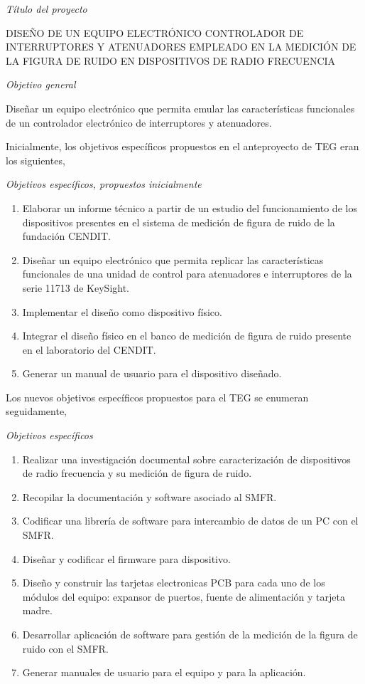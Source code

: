 \documentclass[paper=letter,oneside,fontsize=12pt, parskip=full]{article}
\begin{document}
	\emph{Título del proyecto}

	\begin{center}
		DISEÑO DE UN EQUIPO ELECTRÓNICO CONTROLADOR DE
		INTERRUPTORES Y ATENUADORES EMPLEADO EN LA
		MEDICIÓN DE LA FIGURA DE RUIDO EN DISPOSITIVOS DE
		RADIO FRECUENCIA
	\end{center}		

	\emph{Objetivo general}
	
	Diseñar un equipo electrónico que permita emular las características funcionales de un controlador electrónico de interruptores y atenuadores.
	
	Inicialmente, los objetivos específicos propuestos en el anteproyecto de TEG eran los siguientes,
	
	\emph{Objetivos específicos, propuestos inicialmente}
	
	\begin{enumerate}
		\item Elaborar un informe técnico a partir de un estudio del funcionamiento de los
		dispositivos presentes en el sistema de medición de figura de ruido de la fundación
		CENDIT.
		
		\item Diseñar un equipo electrónico que permita replicar las características funcionales de
		una unidad de control para atenuadores e interruptores de la serie 11713 de KeySight.
		
		\item Implementar el diseño como dispositivo físico.
		
		\item Integrar el diseño físico en el banco de medición de figura de ruido presente en el
		laboratorio del CENDIT.
		
		\item Generar un manual de usuario para el dispositivo diseñado.
	\end{enumerate}	
	
	Los nuevos objetivos específicos propuestos para el TEG se enumeran seguidamente,
	
	\emph{Objetivos específicos}
		
	\begin{enumerate}
		\item Realizar una investigación documental sobre caracterización de dispositivos de radio frecuencia y su medición de figura de ruido.
		\item Recopilar la documentación y software asociado al SMFR.
		\item Codificar una librería de software para intercambio de datos de un PC con el SMFR.
		\item Diseñar y codificar el firmware para dispositivo.
		\item Diseño y construir las tarjetas electronicas PCB para cada uno de los módulos del equipo: expansor de puertos, fuente de alimentación y tarjeta madre.
		\item Desarrollar aplicación de software para gestión de la medición de la figura de ruido con el SMFR.
		\item Generar manuales de usuario para el equipo y para la aplicación.
	\end{enumerate}
	
\end{document}
